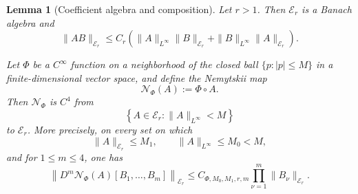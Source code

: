 \documentclass[10pt,a4paper]{amsart}
\newtheorem{lemma}{Lemma}
\begin{document}
\begin{lemma}[Coefficient algebra and composition]
\label{lem:coefficient-algebra}
Let \(r>1\).
Then \(\mathcal E_r\) is a Banach algebra and
\begin{equation*}
 \|AB\|_{\mathcal E_r} \leq C_r \left( \|A\|_{L^\infty}\|B\|_{\mathcal E_r} + \|B\|_{L^\infty}\|A\|_{\mathcal E_r} \right).
\end{equation*}

Let \(\Phi\) be a \(C^\infty\) function on a neighborhood of the closed ball \(\{p:|p|\leq M\}\) in a finite-dimensional vector space, and define the Nemytskii map
\[
 \mathcal N_\Phi(A):=\Phi\circ A.
\]
Then \(\mathcal N_\Phi\) is \(C^4\) from 
\[
 \left\{ A\in\mathcal E_r: \|A\|_{L^\infty}<M \right\}
\]
to \(\mathcal E_r\).
More precisely, on every set on which
\[
 \|A\|_{\mathcal E_r}\leq M_1, \qquad \|A\|_{L^\infty}\leq M_0<M,
\]
and for \(1\leq m\leq4\), one has
\begin{equation*}
 \left\| D^m\mathcal N_\Phi(A)[B_1,\ldots,B_m] \right\|_{\mathcal E_r} \leq C_{\Phi,M_0,M_1,r,m} \prod_{\nu=1}^m \|B_\nu\|_{\mathcal E_r}.
\end{equation*}
\end{lemma}
\end{document}
